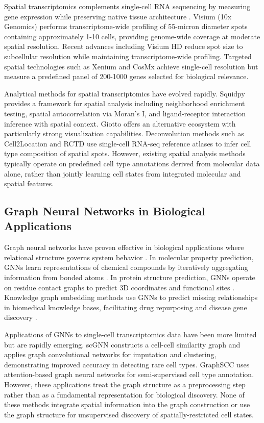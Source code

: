 \documentclass{article}
\begin{document}
Spatial transcriptomics complements single-cell RNA sequencing by measuring gene expression while preserving native tissue architecture \citep{moses2022museum}. Visium (10x Genomics) performs transcriptome-wide profiling of 55-micron diameter spots containing approximately 1-10 cells, providing genome-wide coverage at moderate spatial resolution. Recent advances including Visium HD reduce spot size to subcellular resolution while maintaining transcriptome-wide profiling. Targeted spatial technologies such as Xenium and CosMx achieve single-cell resolution but measure a predefined panel of 200-1000 genes selected for biological relevance.

Analytical methods for spatial transcriptomics have evolved rapidly. Squidpy \citep{palla2022squidpy} provides a framework for spatial analysis including neighborhood enrichment testing, spatial autocorrelation via Moran's I, and ligand-receptor interaction inference with spatial context. Giotto \citep{dries2021giotto} offers an alternative ecosystem with particularly strong visualization capabilities. Deconvolution methods such as Cell2Location \citep{kleshchevnikov2022cell2location} and RCTD \citep{cable2022robust} use single-cell RNA-seq reference atlases to infer cell type composition of spatial spots. However, existing spatial analysis methods typically operate on predefined cell type annotations derived from molecular data alone, rather than jointly learning cell states from integrated molecular and spatial features.

\subsection{Graph Neural Networks in Biological Applications}

Graph neural networks have proven effective in biological applications where relational structure governs system behavior \citep{zhou2020graph}. In molecular property prediction, GNNs learn representations of chemical compounds by iteratively aggregating information from bonded atoms \citep{gilmer2017neural}. In protein structure prediction, GNNs operate on residue contact graphs to predict 3D coordinates and functional sites \citep{ingraham2019generative}. Knowledge graph embedding methods use GNNs to predict missing relationships in biomedical knowledge bases, facilitating drug repurposing and disease gene discovery \citep{zitnik2018modeling}.

Applications of GNNs to single-cell transcriptomics data have been more limited but are rapidly emerging. scGNN \citep{wang2021scgnn} constructs a cell-cell similarity graph and applies graph convolutional networks for imputation and clustering, demonstrating improved accuracy in detecting rare cell types. GraphSCC \citep{sun2021graph} uses attention-based graph neural networks for semi-supervised cell type annotation. However, these applications treat the graph structure as a preprocessing step rather than as a fundamental representation for biological discovery. None of these methods integrate spatial information into the graph construction or use the graph structure for unsupervised discovery of spatially-restricted cell states.
\end{document}
